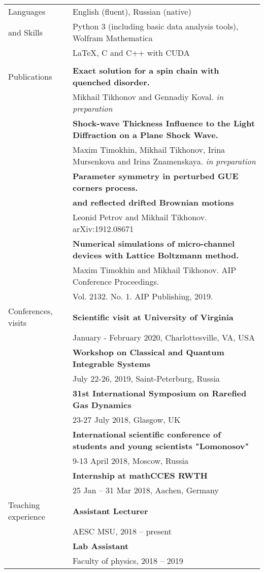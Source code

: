 \documentclass[letterpaper,10pt,oneside,utf8]{article}
\begin{document}
\begin{tabular}{@{} l l}
		\Large{Languages}   & English (fluent), Russian (native) \\
		\Large{and Skills}    	&Python 3 (including basic data analysis tools),  Wolfram Mathematica \\
		& \LaTeX, C and C++ with CUDA\\
		&\\
		\Large{Publications}  
		&\textbf{Exact solution for a spin chain with quenched disorder. }\\&  Mikhail Tikhonov and Gennadiy Koval. \textit{in preparation} \\
		&\textbf{Shock-wave Thickness Influence to the Light Diffraction on a Plane Shock Wave.}\\&
		Maxim Timokhin, Mikhail Tikhonov, Irina Mursenkova and Irina Znamenskaya. \textit{in preparation}\\
		&\textbf{Parameter symmetry in perturbed GUE corners process.	}\\&\textbf{and reflected drifted Brownian motions}\\& Leonid Petrov and  Mikhail Tikhonov. arXiv:1912.08671\\
		&\textbf{Numerical simulations of micro-channel devices with Lattice Boltzmann method. }\\
		&Maxim Timokhin  and Mikhail Tikhonov. AIP Conference Proceedings. \\
		&Vol. 2132. No. 1. AIP Publishing, 2019.\\
		\Large{Conferences, visits} 
		&\textbf{Scientific visit at University of Virginia}\\
		& January - February 2020, Charlottesville, VA, USA  \\
		&\textbf{Workshop on Classical and Quantum Integrable Systems}\\
		&July 22-26, 2019, Saint-Peterburg, Russia\\
		& \textbf{31st International Symposium on Rarefied Gas Dynamics}\\
		& 23-27 July 2018, Glasgow, UK\\
		&\textbf{International scientific conference of students and young scientists "Lomonosov"}\\
		& 9-13 April 2018,  Moscow, Russia\\
		&\textbf{Internship at mathCCES RWTH}\\
		& 25 Jan -- 31 Mar 2018, Aachen, Germany \\

		\Large{Teaching experience}&
		\textbf{Assistant Lecturer}\\
		&AESC MSU, 2018 -- present\\
		&\textbf{Lab Assistant}\\
		&Faculty of physics, 2018 -- 2019\\

		
		
	\end{tabular}
	
\end{document}
